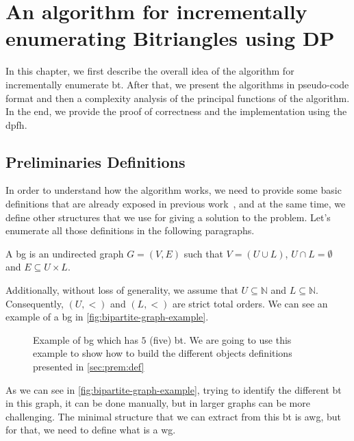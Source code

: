 \chapter[An \acrshort{iebt} using DP]{An algorithm for incrementally enumerating Bitriangles using DP}\label{incr-algo-bt-dp}
In this chapter, we first describe the overall idea of the algorithm for incrementally enumerate 
\acrfull{bt}. After that, we present the algorithms in pseudo-code format and then a complexity analysis of the principal functions of the algorithm.
In the end, we provide the proof of correctness and the implementation using the \acrshort{dpfh}.  

\section{Preliminaries Definitions}\label{sec:prem:def}
In order to understand how the algorithm works, we need to provide some basic definitions that are already exposed in previous work~\cite{btcount}, and
at the same time, we define other structures that we use for giving a solution to the problem.
Let's enumerate all those definitions in the following paragraphs.

\begin{definition}[\acrlong{bg}] 
A \acrfull{bg} is an undirected graph $G=(V,E)$  such that $V=(U\cup L)$, $U\cap L=\emptyset$ and $E\subseteq U\times L$.\cite{Bondy1976}
\end{definition}

Additionally, without loss of generality, we assume that  $U\subseteq \mathbb{N}$ and $L\subseteq \mathbb{N}$. Consequently, $(U,<)$  and $(L,<)$ are strict total orders. We can see an example of a \acrshort{bg}
in \autoref{fig:bipartite-graph-example}.

\begin{figure}[ht]
\centering	
{}
\caption[{[\acrshort{iebt}] Example of \acrlong{bg}}]{Example of \acrlong{bg} which has $5$ (five) \acrshort{bt}. We are going to use this example to show how to build the different objects definitions presented in \autoref{sec:prem:def}}
\label{fig:bipartite-graph-example}
\end{figure}

As we can see in \autoref{fig:bipartite-graph-example}, trying to identify the different \acrshort{bt} in this graph, it can be done manually, but in larger graphs can be more challenging.
The minimal structure that we can extract from this \acrshort{bt} is \acrlong{awg}, but for that, we need to define what is a \acrfull{wg}.

